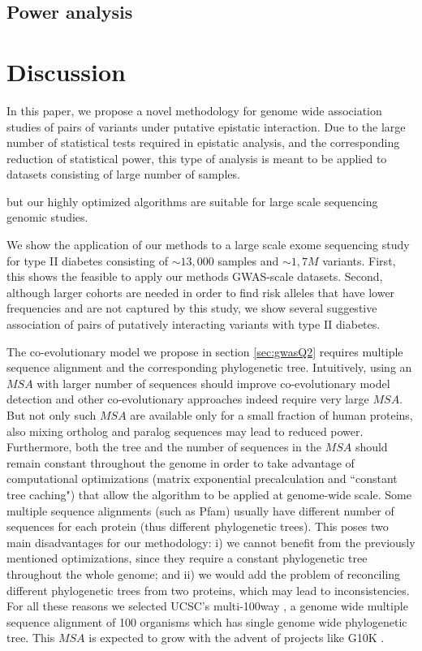 \subsection{Power analysis}


\section{Discussion}

In this paper, we propose a novel methodology for genome wide association studies of pairs of variants under putative epistatic interaction. Due to the large number of statistical tests required in epistatic analysis, and the corresponding reduction of statistical power, this type of analysis is meant to be applied to datasets consisting of large number of samples. 



but our highly optimized algorithms are suitable for large scale sequencing genomic studies.

We show the application of our methods to a large scale exome sequencing study for type II diabetes consisting of $\sim 13,000$ samples and $\sim 1,7M$ variants. First, this shows the feasible to apply our methods GWAS-scale datasets. 
Second, although larger cohorts are needed in order to find risk alleles that have lower frequencies and are not captured by this study, we show several suggestive association of pairs of putatively interacting variants with type II diabetes. 

The co-evolutionary model we propose in section \ref{sec:gwasQ2} requires multiple sequence alignment and the corresponding phylogenetic tree.
Intuitively, using an $MSA$ with larger number of sequences should improve co-evolutionary model detection and other co-evolutionary approaches indeed require very large $MSA$. But not only such $MSA$ are available only for a small fraction of human proteins, also mixing ortholog and paralog sequences may lead to reduced power. 
Furthermore, both the tree and the number of sequences in the $MSA$ should remain constant throughout the genome in order to take advantage of computational optimizations (matrix exponential precalculation and ``constant tree caching") that allow the algorithm to be applied at genome-wide scale. Some multiple sequence alignments (such as Pfam) usually have different number of sequences for each protein (thus different phylogenetic trees). This poses two main disadvantages for our methodology: i) we cannot benefit from the previously mentioned optimizations, since they require a constant phylogenetic tree throughout the whole genome; and ii) we would add the problem of reconciling different phylogenetic trees from two proteins, which may lead to inconsistencies. 
For all these reasons we selected UCSC's multi-100way \cite{karolchik2014ucsc}, a genome wide multiple sequence alignment of 100 organisms which has single genome wide phylogenetic tree. This $MSA$ is expected to grow with the advent of projects like G10K \cite{haussler2009genome}. 

